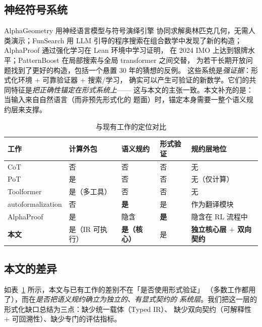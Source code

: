 \documentclass[UTF8,a4paper,11pt]{ctexart}
\begin{document}
\subsection{神经符号系统}

AlphaGeometry \citep{trinh2024alphageometry} 用神经语言模型与符号演绎引擎
协同求解奥林匹克几何，无需人类演示；FunSearch \citep{romera2024funsearch}
用 LLM 引导的程序搜索在组合数学中发现了新的构造；
AlphaProof \citep{hubert2025alphaproof} 通过强化学习在 Lean 环境中学习证明，
在 2024 IMO 上达到银牌水平；PatternBoost
\citep{charton2024patternboost} 在局部搜索与全局 transformer 之间交替，
为若干长期开放问题找到了更好的构造，包括一个悬置 30 年的猜想的反例。
这些系统是\emph{强证据}：形式化环境 $+$ 可靠验证器 $+$ 搜索/学习，
确实可以产生可验证的新数学。它们的共同特征是\emph{把正确性锚定在形式系统上}——
这与本文的主张一致。本文补充的是：当输入来自自然语言（而非预先形式化的
题面）时，锚定本身需要一整个语义规约层来支撑。

\begin{table}[htbp]
\centering
\caption{与现有工作的定位对比}
\label{tab:compare}
\small
\begin{tabular}{@{}p{3.0cm}p{2.5cm}p{2.6cm}p{2.6cm}p{3.0cm}@{}}
\toprule
\textbf{工作} & \textbf{计算外包} & \textbf{语义规约} & \textbf{形式验证} & \textbf{规约层地位} \\
\midrule
CoT \citep{wei2022cot}            & 否 & 否 & 否 & 无 \\
PoT \citep{chen2023pot}           & 是 & 否 & 否 & 无（仅计算）\\
Toolformer \citep{schick2023toolformer} & 是（多工具）& 否 & 否 & 无 \\
autoformalization \citep{wu2022autoformalization} & 否 & \textbf{是} & 是 & 作为翻译模块 \\
AlphaProof \citep{hubert2025alphaproof} & 是 & 隐含 & \textbf{是} & 隐含在 RL 流程中 \\
\addlinespace
\textbf{本文} & 是（IR 可执行）& \textbf{是（核心）}& 是 & \textbf{独立核心层 $+$ 双向契约} \\
\bottomrule
\end{tabular}
\end{table}

\subsection{本文的差异}

如表~\ref{tab:compare} 所示，本文与已有工作的差别不在「是否使用形式验证」
（多数工作都用了），而在\emph{是否把语义规约确立为独立的、有显式契约的
系统层}。我们把这一层的形式化缺口总结为三点：缺少统一载体（Typed IR）、
缺少双向契约（可解释性 $+$ 可回溯性）、缺少专门的评估指标。
\end{document}
